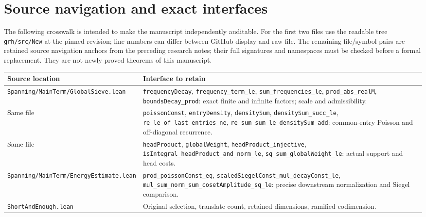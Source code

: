 \documentclass[11pt,a4paper]{article}
\begin{document}
\appendix
\section{Source navigation and exact interfaces}\label{app:source}
The following crosswalk is intended to make the manuscript independently auditable. For the first two files use the readable tree \texttt{grh/\allowbreak src/\allowbreak New} at the pinned revision; line numbers can differ between GitHub display and raw file. The remaining file/symbol pairs are retained source navigation anchors from the preceding research notes; their full signatures and namespaces must be checked before a formal replacement. They are not newly proved theorems of this manuscript.
\begin{longtable}{p{}p{}}
\toprule\textbf{Source location}&\textbf{Interface to retain}\\\midrule\endhead
\texttt{Spanning/\allowbreak MainTerm/\allowbreak  GlobalSieve.lean}&\texttt{frequencyDecay}, \texttt{frequency\_\allowbreak term\_\allowbreak le}, \texttt{sum\_\allowbreak frequencies\_\allowbreak le}, \texttt{prod\_\allowbreak abs\_\allowbreak realM}, \texttt{boundsDecay\_\allowbreak prod}: exact finite and infinite factors; scale and admissibility.\\
Same file&\texttt{poissonConst}, \texttt{entryDensity}, \texttt{densitySum}, \texttt{densitySum\_\allowbreak succ\_\allowbreak le}, \texttt{re\_\allowbreak le\_\allowbreak of\_\allowbreak last\_\allowbreak entries\_\allowbreak ne}, \texttt{re\_\allowbreak sum\_\allowbreak sum\_\allowbreak le\_\allowbreak densitySum\_\allowbreak add}: common-entry Poisson and off-diagonal recurrence.\\
Same file&\texttt{headProduct}, \texttt{globalWeight}, \texttt{headProduct\_\allowbreak injective}, \texttt{isIntegral\_\allowbreak headProduct\_\allowbreak and\_\allowbreak norm\_\allowbreak le}, \texttt{sq\_\allowbreak sum\_\allowbreak globalWeight\_\allowbreak le}: actual support and head costs.\\
\texttt{Spanning/\allowbreak MainTerm/\allowbreak  EnergyEstimate.lean}&\texttt{prod\_\allowbreak poissonConst\_\allowbreak eq}, \texttt{scaledSiegelConst\_\allowbreak mul\_\allowbreak decayConst\_\allowbreak le}, \texttt{mul\_\allowbreak sum\_\allowbreak norm\_\allowbreak sum\_\allowbreak cosetAmplitude\_\allowbreak sq\_\allowbreak le}: precise downstream normalization and Siegel comparison.\\
\texttt{ShortAndEnough.lean}&Original selection, translate count, retained dimensions, ramified codimension.\\

\end{longtable}
\end{document}
